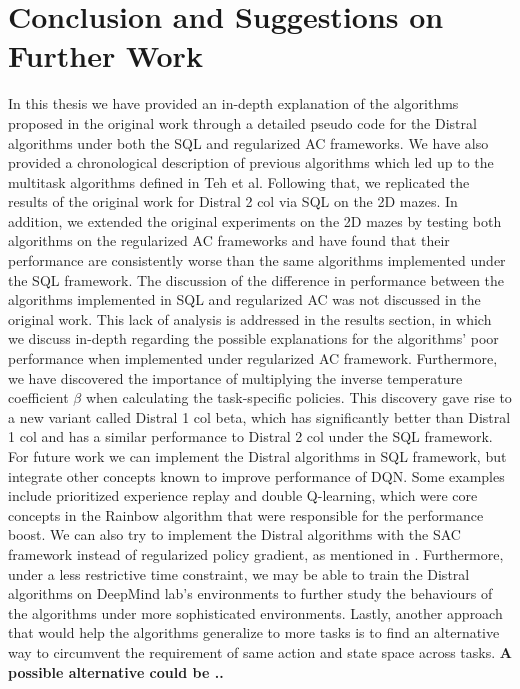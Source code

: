 \documentclass[12pt]{report}
\begin{document}






\chapter{Conclusion and Suggestions on Further Work}

In this thesis we have provided an in-depth explanation of the algorithms proposed in the original work through a detailed pseudo code for the Distral algorithms under both the SQL and regularized AC frameworks. We have also provided a chronological description of previous algorithms which led up to the multitask algorithms defined in Teh et al. Following that, we replicated the results of the original work for Distral 2 col via SQL on the 2D mazes. In addition, we extended the original experiments on the 2D mazes by testing both algorithms on the regularized AC frameworks and have found that their performance are consistently worse than the same algorithms implemented under the SQL framework. The discussion of the difference in performance between the algorithms implemented in SQL and regularized AC was not discussed in the original work. This lack of analysis is addressed in the results section, in which we discuss in-depth regarding the possible explanations for the algorithms' poor performance when implemented under regularized AC framework. Furthermore, we have discovered the importance of multiplying the inverse temperature coefficient $\beta$ when calculating the task-specific policies. This discovery gave rise to a new variant called Distral 1 col beta, which has significantly better than Distral 1 col and has a similar performance to Distral 2 col under the SQL framework.\\

For future work we can implement the Distral algorithms in SQL framework, but integrate other concepts known to improve performance of DQN. Some examples include prioritized experience replay and double Q-learning, which were core concepts in the Rainbow algorithm \cite{hessel2018rainbow} that were responsible for the performance boost. We can also try to implement the Distral algorithms with the SAC framework instead of regularized policy gradient, as mentioned in \cite{haarnoja2018soft}.
Furthermore, under a less restrictive time constraint, we may be able to train the Distral algorithms on DeepMind lab's environments to further study the behaviours of the algorithms under more sophisticated environments. Lastly, another approach that would help the algorithms generalize to more tasks is to find an alternative way to circumvent the requirement of same action and state space across tasks. \textbf{A possible alternative could be ..}
\end{document}
